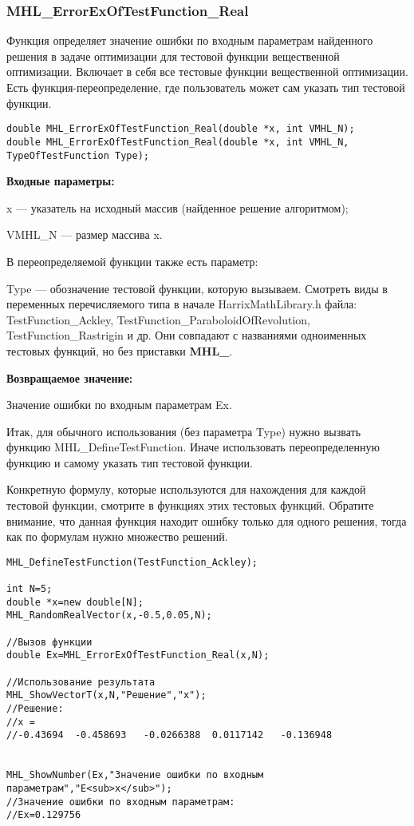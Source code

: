 \documentclass[a4paper,12pt]{article}
\begin{document}
\subsubsection{MHL\_ErrorExOfTestFunction\_Real}\label{MHL_ErrorExOfTestFunction_Real}

Функция определяет значение ошибки по входным параметрам найденного решения в задаче оптимизации для тестовой функции вещественной оптимизации. Включает в себя все тестовые функции вещественной оптимизации. Есть функция-переопределение, где пользователь может сам указать тип тестовой функции.


\begin{lstlisting}[label=code_syntax_MHL_ErrorExOfTestFunction_Real,caption=Синтаксис]
double MHL_ErrorExOfTestFunction_Real(double *x, int VMHL_N);
double MHL_ErrorExOfTestFunction_Real(double *x, int VMHL_N, TypeOfTestFunction Type);
\end{lstlisting}

\textbf{Входные параметры:}

x --- указатель на исходный массив (найденное решение алгоритмом);

VMHL\_N --- размер массива x.

В переопределяемой функции также есть параметр:
  
Type --- обозначение тестовой функции, которую вызываем.
Смотреть виды в переменных перечисляемого типа в начале HarrixMathLibrary.h файла: TestFunction\_Ackley, TestFunction\_ParaboloidOfRevolution, TestFunction\_Rastrigin и др. Они совпадают с названиями одноименных тестовых функций, но без приставки \textbf{MHL\_}.

\textbf{Возвращаемое значение:}
 
Значение ошибки по входным параметрам Ex.

Итак, для обычного использования (без параметра Type) нужно вызвать функцию MHL\_DefineTestFunction. Иначе использовать переопределенную функцию и самому указать тип тестовой функции.

Конкретную формулу, которые используются для нахождения для каждой тестовой функции, смотрите в функциях этих тестовых функций. Обратите внимание, что данная функция находит ошибку только для одного решения, тогда как по формулам нужно множество решений.


\begin{lstlisting}[label=code_use_MHL_ErrorExOfTestFunction_Real,caption=Пример использования]
MHL_DefineTestFunction(TestFunction_Ackley);

int N=5;
double *x=new double[N];
MHL_RandomRealVector(x,-0.5,0.05,N);

//Вызов функции
double Ex=MHL_ErrorExOfTestFunction_Real(x,N);

//Использование результата
MHL_ShowVectorT(x,N,"Решение","x");
//Решение:
//x =
//-0.43694	-0.458693	-0.0266388	0.0117142	-0.136948


MHL_ShowNumber(Ex,"Значение ошибки по входным параметрам","E<sub>x</sub>");
//Значение ошибки по входным параметрам:
//Ex=0.129756
\end{lstlisting}
\end{document}

